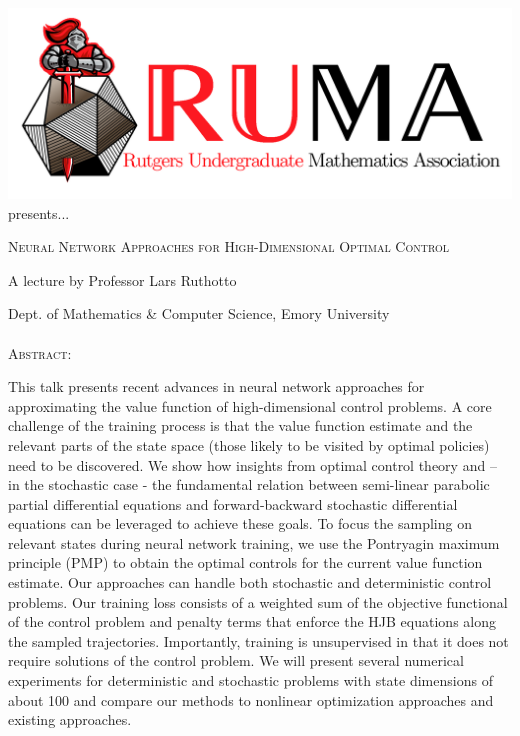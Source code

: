 \documentclass[12pt]{article}
\begin{document}

\begin{center}\includegraphics[scale=.2]{RUMAlogo.png}\\
\large  presents... \\

\vspace{1mm}
\begin{spacing}{2}
{\fontsize{28}{18}\selectfont  \textsc{
    Neural Network Approaches for High-Dimensional Optimal Control
    }} \end{spacing}
 
\begin{spacing}{1}
{\fontsize{18}{18} \selectfont A lecture by Professor Lars Ruthotto}  \end{spacing} 
\large Dept. of Mathematics \& Computer Science, Emory University \\~~\\

\normalsize
\textsc{Abstract:}

\large
This talk presents recent advances in neural network approaches for approximating the value function of high-dimensional control problems. A core challenge of the training process is that the value function estimate and the relevant parts of the state space (those likely to be visited by optimal policies) need to be discovered. We show how insights from optimal control theory and – in the stochastic case - the fundamental relation between semi-linear parabolic partial differential equations and forward-backward stochastic differential equations can be leveraged to achieve these goals. To focus the sampling on relevant states during neural network training, we use the Pontryagin maximum principle (PMP) to obtain the optimal controls for the current value function estimate. Our approaches can handle both stochastic and deterministic control problems. Our training loss consists of a weighted sum of the objective functional of the control problem and penalty terms that enforce the HJB equations along the sampled trajectories. Importantly, training is unsupervised in that it does not require solutions of the control problem. We will present several numerical experiments for deterministic and stochastic problems with state dimensions of about 100 and compare our methods to nonlinear optimization approaches and existing approaches.


\end{center}
\end{document}
